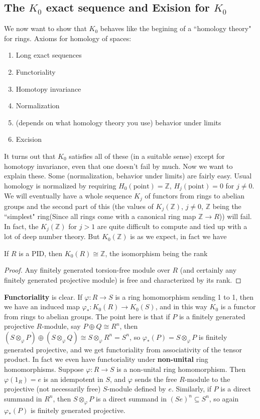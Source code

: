 \documentclass[main]{subfiles}
\begin{document}
\subsection{The $K_0$ exact sequence and Exision for $K_0$}

We now want to show that $K_0$ behaves like the begining of a ``homology theory" for rings. Axioms for homology of spaces:
\begin{enumerate}[label=\alph*)]
\item Long exact sequences
\item Functoriality
\item Homotopy invariance
\item Normalization
\item (depends on what homology theory you use) behavior under limits
\item Excision
\end{enumerate}

It turns out that $K_0$ satisfies all of these (in a suitable sense) except for homotopy invariance, even that one doesn't fail by much. Now we want to explain these. Some (normalization, behavior under limits) are fairly easy. Usual homology is normalized by requiring $H_0(\text{point})=\mathbb Z$, $H_j(\text{point})=0$ for $j\neq0$. We will eventually have a whole sequence $K_j$ of functors from rings to abelian groups and the second part of this (the values of $K_j(\mathbb Z)$, $j\neq0$, $\mathbb Z$ being the ``simplest" ring(Since all rings come with a canonical ring map $\mathbb Z\to R$)) will fail. In fact, the $K_j(\mathbb Z)$ for $j>1$ are quite difficult to compute and tied up with a lot of deep number theory. But $K_0(\mathbb Z)$ is as we expect, in fact we have

\begin{proposition}
If $R$ is a PID, then $K_0(R)\cong\mathbb Z$, the isomorphism being the rank
\end{proposition}

\begin{proof}
Any finitely generated torsion-free module over $R$ (and certainly any finitely generated projective module) is free and characterized by its rank.
\end{proof}

\textbf{Functoriality} is clear. If $\varphi:R\to S$ is a ring homomorphism sending 1 to 1, then we have an induced map $\varphi_*:K_0(R)\to K_0(S)$, and in this way $K_0$ is a functor from rings to abelian groups. The point here is that if $P$ is a finitely generated projective $R$-module, say $P\oplus Q\cong R^n$, then $(S\otimes_{\varphi}P)\oplus(S\otimes_{\varphi}Q)\cong S\otimes_{\varphi}R^n=S^n$, so $\varphi_*(P)=S\otimes_{\varphi}P$ is finitely generated projective, and we get functoriality from associativity of the tensor product. In fact we even have functoriality under \textbf{non-unital} ring homomorphisms. Suppose $\varphi:R\to S$ is a non-unital ring homomorphism. Then $\varphi(1_R)=e$ is an idempotent in $S$, and $\varphi$ sends the free $R$-module to the projective (not necessarily free) $S$-module defined by $e$. Similarly, if $P$ is a direct summand in $R^n$, then $S\otimes_{\varphi}P$ is a direct summand in $(Se)^n\subseteq S^n$, so again $\varphi_*(P)$ is finitely generated projective.
\end{document}
